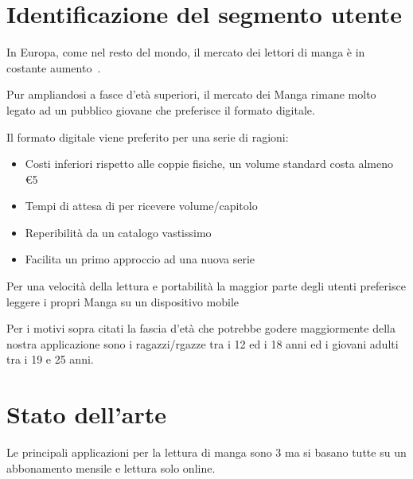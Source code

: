 \documentclass{report}
\begin{document}
\chapter{Identificazione del segmento utente}

In Europa, come nel resto del mondo, il mercato dei lettori di manga è
in costante aumento~\cite{mangaOut}.

Pur ampliandosi a fasce d'età superiori, il mercato dei Manga rimane
molto legato ad un pubblico giovane che preferisce il formato digitale.

Il formato digitale viene preferito per una serie di ragioni:

\begin{itemize}
	\item Costi inferiori rispetto alle coppie fisiche, un volume standard costa almeno \euro{5}
	\item Tempi di attesa di per ricevere volume/capitolo
	\item Reperibilità da un catalogo vastissimo
	\item Facilita un primo approccio ad una nuova serie
\end{itemize}

Per una velocità della lettura e portabilità la maggior parte degli
utenti preferisce leggere i propri Manga su un dispositivo mobile~\cite{NLTreport}

Per i motivi sopra citati la fascia d'età che potrebbe godere
maggiormente della nostra applicazione sono i ragazzi/rgazze tra i 12 ed
i 18 anni ed i giovani adulti tra i 19 e 25 anni.

\chapter{Stato dell'arte}

Le principali applicazioni per la lettura di manga sono 3 ma si basano
tutte su un abbonamento mensile e lettura solo online.
\end{document}
